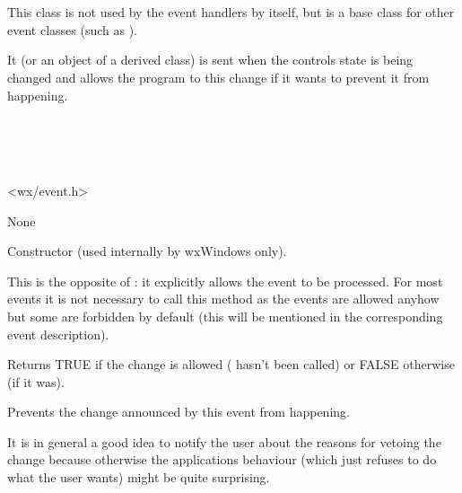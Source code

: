 \section{}\label{wxnotifyevent}

This class is not used by the event handlers by itself, but is a base class
for other event classes (such as ).

It (or an object of a derived class) is sent when the controls state is being
changed and allows the program to  this
change if it wants to prevent it from happening.


\\
\\
\\


<wx/event.h>


None




\label{wxnotifyeventconstr}


Constructor (used internally by wxWindows only).

\label{wxnotifyeventallow}


This is the opposite of : it explicitly
allows the event to be processed. For most events it is not necessary to call
this method as the events are allowed anyhow but some are forbidden by default
(this will be mentioned in the corresponding event description).

\label{wxnotifyeventisallowed}


Returns TRUE if the change is allowed ( 
hasn't been called) or FALSE otherwise (if it was).

\label{wxnotifyeventveto}


Prevents the change announced by this event from happening.

It is in general a good idea to notify the user about the reasons for vetoing
the change because otherwise the applications behaviour (which just refuses to
do what the user wants) might be quite surprising.

